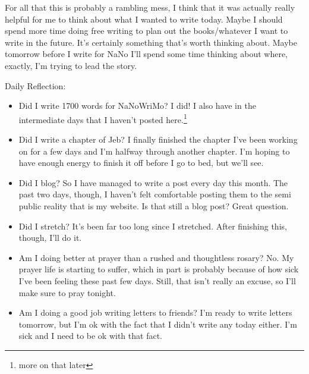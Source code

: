 \documentclass[12pt]{article}[titlepage]
\newcommand{\1}{\={a}}
\newcommand{\2}{\={e}}
\newcommand{\3}{\={\i}}
\newcommand{\4}{\=o}
\newcommand{\5}{\=u}
\newcommand{\6}{\={A}}
\renewcommand{\,}{\textsuperscript{,}}
\begin{document}
For all that this is probably a rambling mess, I think that it was actually really helpful for me to think about what I wanted to write today.
Maybe I should spend more time doing free writing to plan out the books/whatever I want to write in the future.
It's certainly something that's worth thinking about.
Maybe tomorrow before I write for NaNo I'll spend some time thinking about where, exactly, I'm trying to lead the story.

Daily Reflection:
\begin{itemize}
\item Did I write 1700 words for NaNoWriMo? I did! I also have in the intermediate days that I haven't posted here.\footnote{more on that later}
\item Did I write a chapter of Jeb?
I finally finished the chapter I've been working on for a few days and I'm halfway through another chapter.
I'm hoping to have enough energy to finish it off before I go to bed, but we'll see.
\item Did I blog? So I have managed to write a post every day this month.
The past two days, though, I haven't felt comfortable posting them to the semi public reality that is my website.
Is that still a blog post? Great question.
\item Did I stretch? It's been far too long since I stretched. After finishing this, though, I'll do it.
\item Am I doing better at prayer than a rushed and thoughtless rosary? No. My prayer life is starting to suffer, which in part is probably because of how sick I've been feeling these past few days.
Still, that isn't really an excuse, so I'll make sure to pray tonight.
\item Am I doing a good job writing letters to friends?
I'm ready to write letters tomorrow, but I'm ok with the fact that I didn't write any today either. I'm sick and I need to be ok with that fact.
\end{itemize}
\end{document}
